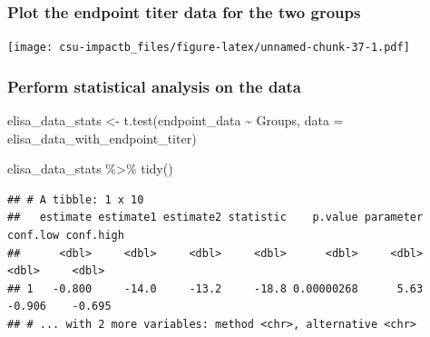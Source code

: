 \documentclass[
]{book}
\newenvironment{Shaded}{\begin{snugshade}}{\end{snugshade}}
\newcommand{\AttributeTok}[1]{\textcolor[rgb]{0.77,0.63,0.00}{#1}}
\newcommand{\DecValTok}[1]{\textcolor[rgb]{0.00,0.00,0.81}{#1}}
\newcommand{\FunctionTok}[1]{\textcolor[rgb]{0.00,0.00,0.00}{#1}}
\newcommand{\NormalTok}[1]{#1}
\newcommand{\OtherTok}[1]{\textcolor[rgb]{0.56,0.35,0.01}{#1}}
\newcommand{\SpecialCharTok}[1]{\textcolor[rgb]{0.00,0.00,0.00}{#1}}
\begin{document}
\hypertarget{plot-the-endpoint-titer-data-for-the-two-groups}{%
\subsubsection{Plot the endpoint titer data for the two groups}\label{plot-the-endpoint-titer-data-for-the-two-groups}}

\begin{Shaded}
\end{Shaded}

\texttt{[image: csu-impactb\_files/figure-latex/unnamed-chunk-37-1.pdf]}

\hypertarget{perform-statistical-analysis-on-the-data}{%
\subsubsection{Perform statistical analysis on the data}\label{perform-statistical-analysis-on-the-data}}

\begin{Shaded}
\begin{Highlighting}[]
\NormalTok{elisa\_data\_stats }\OtherTok{\textless{}{-}} \FunctionTok{t.test}\NormalTok{(endpoint\_data }\SpecialCharTok{\textasciitilde{}}\NormalTok{ Groups, }
                           \AttributeTok{data =}\NormalTok{ elisa\_data\_with\_endpoint\_titer)}

\NormalTok{elisa\_data\_stats }\SpecialCharTok{\%\textgreater{}\%}
  \FunctionTok{tidy}\NormalTok{()}
\end{Highlighting}
\end{Shaded}

\begin{verbatim}
## # A tibble: 1 x 10
##   estimate estimate1 estimate2 statistic    p.value parameter conf.low conf.high
##      <dbl>     <dbl>     <dbl>     <dbl>      <dbl>     <dbl>    <dbl>     <dbl>
## 1   -0.800     -14.0     -13.2     -18.8 0.00000268      5.63   -0.906    -0.695
## # ... with 2 more variables: method <chr>, alternative <chr>
\end{verbatim}
\end{document}
